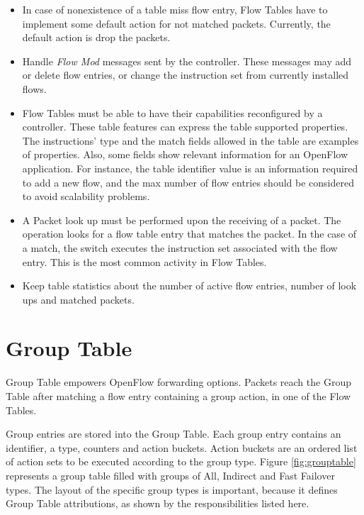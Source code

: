 	\begin{itemize}

    \item In case of nonexistence of a table miss flow entry, Flow Tables have to implement some default action for not matched packets. Currently, the default action is drop the packets. 

	\item Handle \textit{Flow Mod} messages sent by the controller. These messages may add or delete flow entries, or change the instruction set from currently installed flows.  

	\item Flow Tables must be able to have their capabilities reconfigured by a controller. These table features can express the table supported properties. The instructions' type and the match fields allowed in the table are examples of properties. Also, some fields show relevant information for an OpenFlow application. For instance, the table identifier value is an information required to add a new flow, and the max number of flow entries should be considered to avoid scalability problems.           

    \item A Packet look up must be performed upon the receiving of a packet. The operation looks for a flow table entry that matches the packet. In the case of a match, the switch executes the instruction set associated with the flow entry. This is the most common activity in Flow Tables.   
    
    \item Keep table statistics about the number of active flow entries, number of look ups and matched packets.  

	\end{itemize}

	\section{Group Table}

	Group Table empowers OpenFlow forwarding options. Packets reach the Group Table after matching a flow entry containing a group action, in one of the Flow Tables. 
	
	Group entries are stored into the Group Table. Each group entry contains an identifier, a type, counters and action buckets. Action buckets are an ordered list of action sets to be executed according to the group type. Figure \ref{fig:grouptable} represents a group table filled with groups of All, Indirect and Fast Failover types. The layout of the specific group types is important, because it defines Group Table attributions, as shown by the responsibilities listed here.
	
